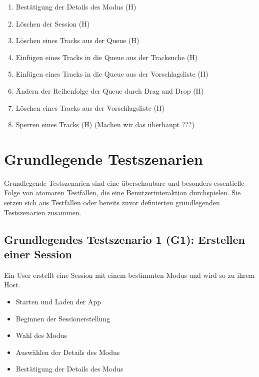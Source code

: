 \documentclass[oneside, ngerman]{sdqtechreport}
\begin{document}
\begin{enumerate}
    \item Bestätigung der Details des Modus (H)
    \item Löschen der Session (H)
    \item Löschen eines Tracks aus der Queue (H)
    \item Einfügen eines Tracks in die Queue aus der Tracksuche (H)
    \item Einfügen eines Tracks in die Queue aus der Vorschlagsliste (H)
    \item Ändern der Reihenfolge der Queue durch Drag and Drop (H)
    \item Löschen eines Tracks aus der Vorschlagsliste (H)
    \item Sperren eines Tracks (H) (Machen wir das überhaupt ???)
\end{enumerate}

\section{Grundlegende Testszenarien}
\label{sec:Tests:GrundlegendeTestszenarien}

Grundlegende Testszenarien sind eine überschaubare und besonders essentielle Folge von atomaren Testfällen, die eine Benutzerinteraktion durchspielen. Sie setzen sich aus Testfällen oder bereits zuvor definierten grundlegenden Testszenarien zusammen.

\subsection{Grundlegendes Testszenario 1 (G1): Erstellen einer Session}
\label{subsec:Tests:GrundlegendeTestszenarien:G1}
Ein User erstellt eine Session mit einem bestimmten Modus und wird so zu ihrem Host.
\begin{itemize}
    \item Starten und Laden der App
    \item Beginnen der Sessionerstellung
    \item Wahl des Modus
    \item Auswählen der Details des Modus
    \item Bestätigung der Details des Modus
\end{itemize}
\end{document}
